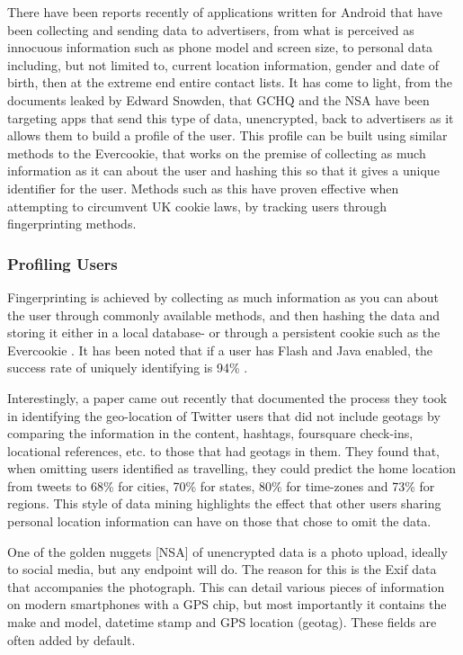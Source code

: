 There have been reports recently \cite{intro:bbc_flashlight_app} of applications written for Android that have been collecting and sending data to advertisers, from what is perceived as innocuous information such as phone model and screen size, to personal data including, but not limited to, current location information, gender and date of birth, then at the extreme end entire contact lists. It has come to light, from the documents leaked by Edward Snowden, that GCHQ and the NSA have been targeting apps that send this type of data, unencrypted, back to advertisers as it allows them to build a profile of the user. This profile can be built using similar methods to the Evercookie, that works on the premise of collecting as much information as it can about the user and hashing this so that it gives a unique identifier for the user. Methods such as this have proven effective when attempting to circumvent UK cookie laws, by tracking users through fingerprinting methods.

\subsubsection{Profiling Users}

Fingerprinting is achieved by collecting as much information as you can about the user through commonly available methods, and then hashing the data and storing it either in a local database- or through a persistent cookie such as the Evercookie \cite{intro:evercookie}. It has been noted that if a user has Flash and Java enabled, the success rate of uniquely identifying is 94\% \cite{intro:unique_browser}. 

Interestingly, a paper \cite{intro:twitter_home_location} came out recently that documented the process they took in identifying the geo-location of Twitter users that did not include geotags by comparing the information in the content, hashtags, foursquare check-ins, locational references, etc. to those that had geotags in them. They found that, when omitting users identified as travelling, they could predict the home location from tweets to 68\% for cities, 70\% for states, 80\% for time-zones and 73\% for regions. This style of data mining highlights the effect that other users sharing personal location information can have on those that chose to omit the data. 

One of the golden nuggets [NSA] of unencrypted data is a photo upload, ideally to social media, but any endpoint will do. The reason for this is the Exif data that accompanies the photograph. This can detail various pieces of information on modern smartphones with a GPS chip, but most importantly it contains the make and model, datetime stamp and GPS location (geotag). These fields are often added by default. 

